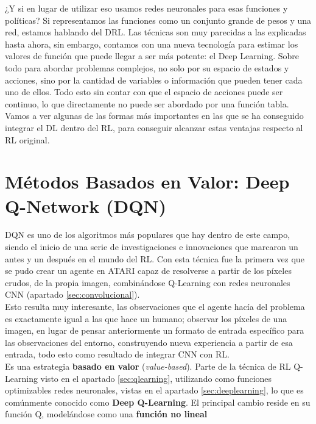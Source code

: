 \documentclass[11pt,fleqn]{book} %
\begin{document}
¿Y si en lugar de utilizar eso usamos redes neuronales para esas funciones y políticas? Si representamos las funciones como un conjunto grande de pesos y una red, estamos hablando del DRL. Las técnicas son muy parecidas a las explicadas hasta ahora, sin embargo, contamos con una nueva tecnología para estimar los valores de función que puede llegar a ser más potente: el Deep Learning. Sobre todo para abordar problemas complejos, no solo por su espacio de estados y acciones, sino por la cantidad de variables o información que pueden tener cada uno de ellos. Todo esto sin contar con que el espacio de acciones puede ser continuo, lo que directamente no puede ser abordado por una función tabla. \\

Vamos a ver algunas de las formas más importantes en las que se ha conseguido integrar el DL dentro del RL, para conseguir alcanzar estas ventajas respecto al RL original.

\section{Métodos Basados en Valor: Deep Q-Network (DQN)}\label{sec:DQN}

DQN \cite{article:DQN} \cite{article:DQN2} es uno de los algoritmos más populares que hay dentro de este campo, siendo el inicio de una serie de investigaciones e innovaciones que marcaron un antes y un después en el mundo del RL. Con esta técnica fue la primera vez que se pudo crear un agente en ATARI capaz de resolverse a partir de los píxeles crudos, de la propia imagen, combinándose Q-Learning con redes neuronales CNN (apartado \ref{sec:convolucional}). \\
 
Esto resulta muy interesante, las observaciones que el agente hacía del problema es exactamente igual a las que hace un humano; observar los píxeles de una imagen, en lugar de pensar anteriormente un formato de entrada específico para las observaciones del entorno, construyendo nueva experiencia a partir de esa entrada, todo esto como resultado de integrar CNN con RL. \\

Es una estrategia \textbf{basado en valor} (\textit{value-based}). Parte de la técnica de RL Q-Learning visto en el apartado \ref{sec:qlearning}, utilizando como funciones optimizables redes neuronales, vistas en el apartado \ref{sec:deeplearning}, lo que es comúnmente conocido como \textbf{Deep Q-Learning}. El principal cambio reside en su función Q, modelándose como una \textbf{función no lineal}\\
\end{document}
